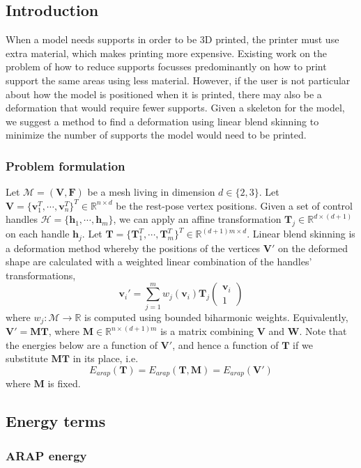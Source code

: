 \documentclass[10pt]{article}
\newcommand{\R}{\mathbb{R}}
\newcommand{\calM}{\mathcal{M}}
\newcommand{\calH}{\mathcal{H}}
\newcommand{\bV}{\mathbf{V}}
\newcommand{\bF}{\mathbf{F}}
\newcommand{\bW}{\mathbf{W}}
\newcommand{\bM}{\mathbf{M}}
\newcommand{\bT}{\mathbf{T}}
\newcommand{\bv}{\mathbf{v}}
\newcommand{\bh}{\mathbf{h}}
\begin{document}

\subsection*{Introduction}
When a model needs supports in order to be 3D printed, the printer must use extra material, which makes printing more expensive. Existing work on the problem of how to reduce supports focusses predominantly on how to print support the same areas using less material. However, if the user is not particular about how the model is positioned when it is printed, there may also be a deformation that would require fewer supports. Given a skeleton for the model, we suggest a method to find a deformation using linear blend skinning to minimize the number of supports the model would need to be printed.

\subsubsection*{Problem formulation}
Let $\calM = (\bV, \bF)$ be a mesh living in dimension $d\in \{2,3\}$. Let $\bV = \{\bv_1^T, \cdots, \bv_n^T\}^T \in \R^{n \times d}$ be the rest-pose vertex positions. Given a set of control handles $\calH = \{ \bh_1, \cdots, \bh_m \}$, we can apply an affine transformation $\bT_j \in \R^{d \times (d+1)}$ on each handle $\bh_j$. Let $\bT = \{ \bT_1^T, \cdots, \bT_m^T \}^T \in \R^{(d+1)m \times d}$. Linear blend skinning is a deformation method whereby the positions of the vertices $\bV'$ on the deformed shape are calculated with a weighted linear combination of the handles' transformations,
\[
    \bv_i' = \sum_{j=1}^m w_j(\bv_i) \bT_j 
    \begin{pmatrix} 
    \bv_i \\
    1
    \end{pmatrix} 
\]
where $w_j: \calM \rightarrow \R$ is computed using bounded biharmonic weights. Equivalently, $\bV' = \bM \bT$, where $\bM \in \R^{n \times (d+1)m}$ is a matrix combining $\bV$ and $\bW$. Note that the energies below are a function of $\bV'$, and hence a function of $\bT$ if we substitute $\bM \bT$ in its place, i.e. 
\[
    E_{arap}(\bT) = E_{arap}(\bT, \bM) = E_{arap}(\bV')
\]
where $\bM$ is fixed.

\subsection*{Energy terms}
\subsubsection*{ARAP energy}
\end{document}

